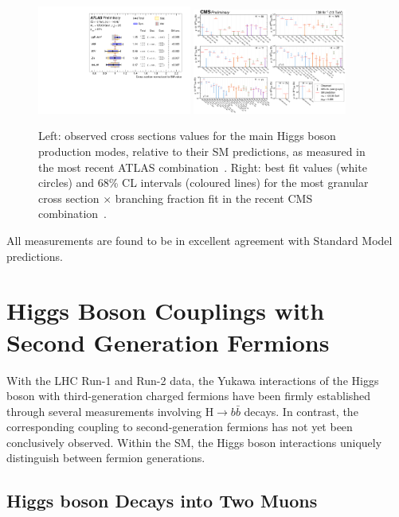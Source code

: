 \documentclass[a4paper,11pt]{article}
\begin{document}
\begin{figure}[!htbp]
\centering
\includegraphics[width=0.45\textwidth]{stxs-atlas-xsecs}
\includegraphics[width=0.45\textwidth]{stxs-cms-xsecs}
\caption
    {Left: observed cross sections values for the main Higgs boson
      production modes, relative to their SM predictions, as measured
      in the most recent ATLAS combination~\cite{atlas-comb}. Right:
      best fit values (white circles) and 68\% CL intervals (coloured
      lines) for the most granular cross section $\times$ branching
      fraction fit in the recent CMS combination~\cite{cms-comb}.
      \label{fig:stxs}
    }
\end{figure}
%
All measurements are found to be in excellent agreement with Standard Model predictions.

\section{Higgs Boson Couplings with Second Generation Fermions}

With the LHC Run-1 and Run-2 data, the Yukawa interactions of the
Higgs boson with third-generation charged fermions have been firmly
established through several measurements involving $\textrm{H}\to b\bar b$ decays. In contrast, the
corresponding coupling to second-generation fermions has not yet been
conclusively observed. Within the SM, the Higgs boson
interactions uniquely distinguish between fermion generations.

\subsection{Higgs boson Decays into Two Muons}
\end{document}
